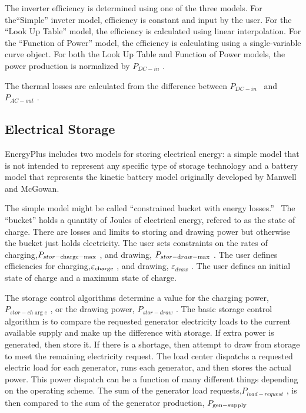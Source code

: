 The inverter efficiency is determined using one of the three models. For the``Simple'' inveter model, efficiency is constant and input by the user. For the ``Look Up Table'' model, the efficiency is calculated using linear interpolation. For the ``Function of Power'' model, the efficiency is calculating using a single-variable curve object. For both the Look Up Table and Function of Power models, the power production is normalized by \({P_{DC - in}}\) .

The thermal losses are calculated from the difference between \({P_{DC - in}}\) ~and \({P_{AC - out}}\) .

\subsection{Electrical Storage}\label{electrical-storage}

EnergyPlus includes two models for storing electrical energy: a simple model that is not intended to represent any specific type of storage technology and a battery model that represents the kinetic battery model originally developed by Manwell and McGowan.

The simple model might be called ``constrained bucket with energy losses.''~ The ``bucket'' holds a quantity of Joules of electrical energy, refered to as the state of charge. There are losses and limits to storing and drawing power but otherwise the bucket just holds electricity. The user sets constraints on the rates of charging,\({P_{stor - {\rm{charge - max}}}}\) , and drawing, \({P_{stor - {\rm{d}}raw{\rm{ - max}}}}\) . The user defines efficiencies for charging,\({\varepsilon_{{\rm{charge}}}}\) , and drawing, \({\varepsilon_{draw}}\) . The user defines an initial state of charge and a maximum state of charge.

The storage control algorithms determine a value for the charging power, \({P_{stor - ch\arg e}}\) , or the drawing power, \({P_{stor - draw}}\) . The basic storage control algorithm is to compare the requested generator electricity loads to the current available supply and make up the difference with storage. If extra power is generated, then store it. If there is a shortage, then attempt to draw from storage to meet the remaining electricity request. The load center dispatchs a requested electric load for each generator, runs each generator, and then stores the actual power. This power dispatch can be a function of many different things depending on the operating scheme. The sum of the generator load requests,\({P_{load - request}}\) , is then compared to the sum of the generator production, \({P_{{\rm{gen}} - {\rm{supply}}}}\)

